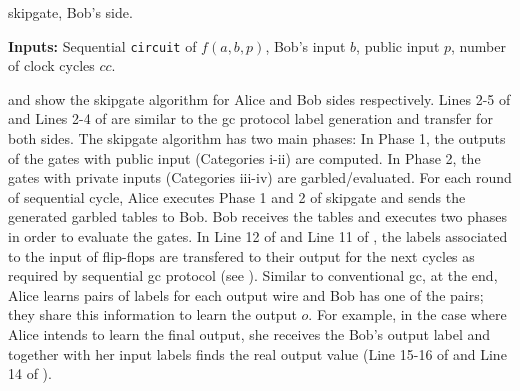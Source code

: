 \begin{algorithm}
\caption{\gls{skipgate}, Bob's side.}\label{alg:bob}
\textbf{Inputs:} Sequential \texttt{circuit} of $f(a,b,p)$, Bob's input $b$, public input $p$, number of clock cycles $cc$.\\
\begin{algorithmic}[1]
\ENDFOR
{}
\end{algorithmic}
\end{algorithm}

 and  show the \gls{skipgate} algorithm for Alice and Bob sides respectively.
Lines 2-5 of  and Lines 2-4 of  are similar to the \acrshort{gc} protocol label generation and transfer for both sides.
The \gls{skipgate} algorithm has two main phases:
In Phase 1, the outputs of the gates with public input (Categories i-ii) are computed.
In Phase 2, the gates with private inputs (Categories iii-iv) are  garbled/evaluated.
For each round of sequential cycle, Alice executes Phase 1 and 2 of \gls{skipgate} and sends the generated garbled tables to Bob.
Bob receives the tables and executes two phases in order to evaluate the gates.
In Line 12 of  and Line 11 of , the labels associated to the input of flip-flops are transfered to their output for the next cycles as required by sequential \acrshort{gc} protocol (see ).
Similar to conventional \acrshort{gc}, at the end, Alice learns pairs of labels for each output wire and Bob has one of the pairs; they share this information to learn the output $o$.
For example, in the case where Alice intends to learn the final output, she receives the Bob's output label and together with her input labels finds the real output value (Line 15-16 of  and Line 14 of ).

